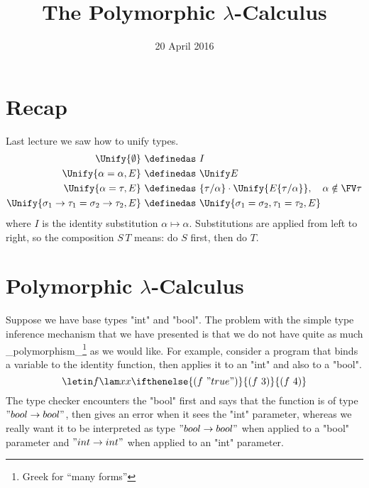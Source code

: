 \title{The Polymorphic $\lambda$-Calculus}
\date{20 April 2016}
\maketitle

\section{Recap}

Last lecture we saw how to unify types.
\begin{align*}
\Unify{\emptyset}\ &\definedas\ I\\
\Unify{\alpha=\alpha, E}\ &\definedas\ \Unify E\\
\Unify{\alpha=\tau, E}\ &\definedas\ \{\tau/\alpha\}\cdot\Unify{E\{\tau/\alpha\}},\quad\alpha\notin\FV\tau\\
\Unify{\sigma_1\to\tau_1=\sigma_2\to\tau_2, E}\ &\definedas\ \Unify{\sigma_1=\sigma_2,\tau_1=\tau_2, E}
\end{align*}
where $I$ is the identity substitution $\alpha\mapsto\alpha$. Substitutions are applied from left to right, so the composition $S\,T$ means: do $S$ first, then do $T$.

%
%
\section{Polymorphic $\lambda$-Calculus}

Suppose we have base types "int" and "bool".
The problem with the simple type inference mechanism that we have presented
is that we do not have quite as much _polymorphism_\footnote{Greek for ``many forms''}
as we would like.
For example, consider a program that binds a variable to the identity
function, then applies it to an "int" and also to a "bool".
\begin{equation}
\letin f{\lam xx}{\ifthenelse{(f~"true")}{(f~3)}{(f~4)}}\label{eqn:polyexample}
\end{equation}
The type checker encounters the "bool" first and says
that the function is of type $"bool\to bool"$, then gives
an error when it sees the "int"
parameter, whereas we really want it to be interpreted
as type $"bool\to bool"$ when applied to a "bool"
parameter and $"int\to int"$ when applied to an "int"
parameter.

